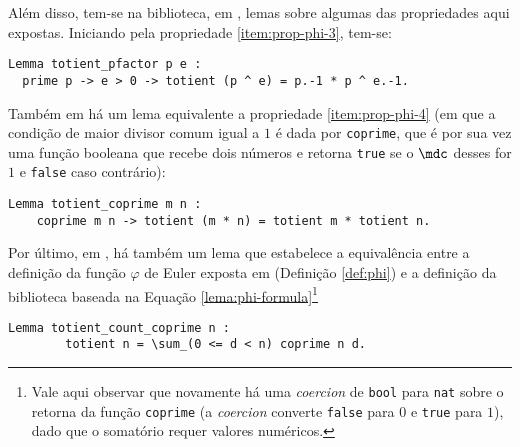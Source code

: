 Além disso, tem-se na biblioteca, em \cite{mathcomp-prime}, lemas sobre algumas das propriedades aqui expostas. Iniciando pela propriedade \ref{item:prop-phi-3}, tem-se:
\begin{lstlisting}[language=coq,frame=single,tabsize=1]
Lemma totient_pfactor p e :
  prime p -> e > 0 -> totient (p ^ e) = p.-1 * p ^ e.-1.
\end{lstlisting}
Também em \cite{mathcomp-prime} há um lema equivalente a propriedade \ref{item:prop-phi-4} (em que a condição de maior divisor comum igual a $1$ é dada por \lstinline[language = coq]{coprime}, que é por sua vez uma função booleana que recebe dois números e retorna \lstinline[language = coq]{true} se o $\mdc$ desses for $1$ e \lstinline[language = coq]{false} caso contrário):
\begin{lstlisting}[language=coq,frame=single,tabsize=1]
Lemma totient_coprime m n :
    coprime m n -> totient (m * n) = totient m * totient n.
\end{lstlisting}
Por último, em \cite{mathcomp-prime}, há também um lema que estabelece a equivalência entre a definição da função $\varphi$ de Euler exposta em \cite[p.~48]{book:2399854} (Definição \ref{def:phi}) e a definição da biblioteca baseada na Equação \ref{lema:phi-formula}\footnote{Vale aqui observar que novamente há uma \textit{coercion} de \lstinline[language = coq]{bool} para \lstinline[language = coq]{nat} sobre o retorna da função \lstinline[language = coq]{coprime} (a \textit{coercion} converte \lstinline[language = coq]{false} para $0$ e \lstinline[language = coq]{true} para $1$), dado que o somatório requer valores numéricos.}%
\begin{lstlisting}[language=coq,frame=single,tabsize=1]
    Lemma totient_count_coprime n : 
        totient n = \sum_(0 <= d < n) coprime n d.
\end{lstlisting} 

